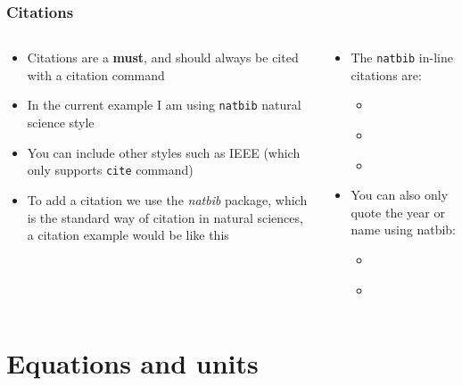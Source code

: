 \documentclass[
    10pt,
    aspectratio=169,
    xcolor={dvipsnames},
    spanish,
    ]{beamer}
\begin{document}
\begin{frame}
  \frametitle{Citations}
  \centering
  \begin{columns}
    \begin{column}{0.4\textwidth}
      \begin{itemize}
        \item Citations are a \textbf{must}, and should always be cited with a citation command
        \item In the current example I am using \texttt{natbib} natural science style
        \item You can include other styles such as IEEE (which only supports \texttt{cite} command)
        \item To add a citation we use the \textit{natbib} package, which is the standard way of citation in natural sciences, a citation example would be like this \citep{2022A&A...663A.106C}
      \end{itemize}
    \end{column}
    \begin{column}{0.4\textwidth}
      \begin{itemize}
        \item The \texttt{natbib} in-line citations are:
        \begin{itemize}
            \item \citep{2022A&A...663A.106C}
            \item \citet{2022A&A...663A.106C}
            \item \citep[see][]{2022A&A...663A.106C}
        \end{itemize}
        \item You can also only quote the year or name using natbib:
        \begin{itemize}
          \item \citeyear{2022AJ....163...65C}
          \item \citealt{2022AJ....163...65C}
        \end{itemize}
      \end{itemize}
    \end{column}
  \end{columns}
\end{frame}

\section{Equations and units}
\end{document}
